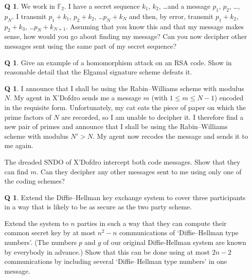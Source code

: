 \documentclass[12pt,a4paper]{article}
\theoremstyle{plain}
\theoremstyle{definition}
\newtheorem{question}[theorem]{Q}
\begin{document}
    \begin{question}
        \label{C4.7}
        We work in ${\mathbb F}_{2}$.
        I have a secret sequence $k_{1}$, $k_{2}$, \dots  and a
        message $p_{1}$, $p_{2}$, \dots, $p_{N}$. I transmit
        $p_{1}+k_{1}$, $p_{2}+k_{2}$, \dots $p_{N}+k_{N}$
        and then, by error, transmit
        $p_{1}+k_{2}$, $p_{2}+k_{3}$, \dots $p_{N}+k_{N+1}$.
        Assuming that you know this and that my
        message makes sense, how would you go about
        finding my message? Can you now decipher
        other messages sent using the same
        part of my secret sequence?
    \end{question}
    \begin{question}
        \label{C4.8}
        Give an example of a homomorphism attack
        on an RSA code. Show in reasonable
        detail that the Elgamal
        signature scheme defeats it.
    \end{question}
    \begin{question}
        \label{C4.9}
        I announce that I shall
        be using the Rabin--Williams scheme with
        modulus $N$. My agent in X'Dofdro sends
        me a message $m$ (with $1\leq m\leq N-1$)
        encoded in the requisite form.
        Unfortunately, my cat eats the piece of paper
        on which the prime factors of $N$ are
        recorded, so I am unable to decipher it.
        I therefore find a new pair of primes
        and announce that I shall
        be using the Rabin--Williams scheme with
        modulus $N'>N$. My agent now recodes
        the message and sends it to me again.

        The dreaded SNDO of X'Dofdro intercept
        both code messages. Show that they
        can find $m$. Can they decipher any
        other messages sent to me using only
        one of the coding schemes?
    \end{question}
    \begin{question}
        \label{C4.10}
        Extend the Diffie--Hellman key exchange system
        to cover three participants in a way that is
        likely to be as secure as the two party scheme.

        Extend the system to $n$ parties in such a way that
        they can compute their common secret key by at
        most $n^{2}-n$ communications of `Diffie--Hellman type numbers'.
        (The numbers $p$
        and $g$ of our original Diffie-Hellman system are
        known by everybody in advance.) Show that this can be done using
        at most $2n-2$ communications by including several
        `Diffie--Hellman type numbers' in one message.
    \end{question}
\end{document}
